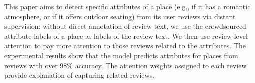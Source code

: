 This paper aims to detect specific attributes of a place (e.g., if it has a romantic atmosphere, or if it offers outdoor seating) from its user reviews via distant supervision: without direct annotation of review text, we use the crowdsourced attribute labels of a place as labels of the review text. We then use review-level attention to pay more attention to those reviews related to the attributes. The experimental results show that the model predicts attributes for places from reviews with over 98\% accuracy. The attention weights assigned to each review provide explanation of capturing related reviews.
